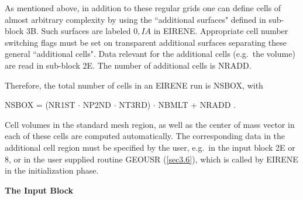 As mentioned above, in addition to these regular grids one can define cells of
almost arbitrary complexity by using the ``additional surfaces" defined in
sub-block 3B.
Such surfaces are labeled $0,IA$  in EIRENE.
Appropriate cell number switching flags must be set on transparent additional
surfaces separating these general ``additional cells".
Data relevant for the additional cells (e.g.\ the volume) are read in sub-block
2E.
The number of additional cells is NRADD.

Therefore, the total number of cells in an EIRENE run is NSBOX, with

NSBOX = (NR1ST $\cdot$ NP2ND $\cdot$ NT3RD) $\cdot$ NBMLT + NRADD .

Cell volumes in the standard mesh region, as well as the center of mass vector
in each of these cells are computed automatically.
The corresponding data in the additional cell region must be specified by the
user, e.g.\ in the input block 2E or 8, or in the user supplied routine GEOUSR
(\cref{sec3.6}), which is called by EIRENE in the initialization phase.

\medskip

\textbf{The Input Block} 

